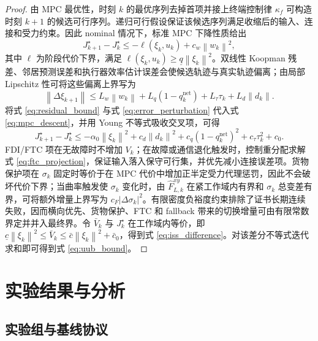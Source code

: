 \documentclass[twocolumn,3p,times,procedia]{elsarticle}
\newcommand{\norm}[1]{\left\lVert #1 \right\rVert}
\begin{document}
\begin{proof}
由 MPC 最优性，时刻 $k$ 的最优序列去掉首项并接上终端控制律 $\kappa_f$ 可构造时刻 $k+1$ 的候选可行序列。递归可行假设保证该候选序列满足收缩后的输入、连接和受力约束。因此 nominal 情况下，标准 MPC 下降性质给出
\begin{equation}
J_{k+1}^\star-J_k^\star\le -\ell(\xi_k,u_k)+c_w\norm{w_k}^2 ,
\label{eq:mpc_descent}
\end{equation}
其中 $\ell$ 为阶段代价下界，满足 $\ell(\xi_k,u_k)\ge \underline q\norm{\xi_k}^2$。双线性 Koopman 残差、邻居预测误差和执行器效率估计误差会使候选轨迹与真实轨迹偏离；由局部 Lipschitz 性可将这些偏离上界写为
\begin{equation}
\norm{\Delta \xi_{k+1}}\le L_w\norm{w_k}+L_q(1-q_k^{\mathrm{net}})+L_\tau\tau_k+L_d\norm{d_k}.
\label{eq:error_perturbation}
\end{equation}
将式 \eqref{eq:residual_bound} 与式 \eqref{eq:error_perturbation} 代入式 \eqref{eq:mpc_descent}，并用 Young 不等式吸收交叉项，可得
\begin{equation}
J_{k+1}^\star-J_k^\star\le -\alpha_0\norm{\xi_k}^2+c_d\norm{d_k}^2+c_q(1-q_k^{\mathrm{net}})^2+c_\tau\tau_k^2+c_0 .
\label{eq:descent_with_disturbance}
\end{equation}
FDI/FTC 项在无故障时不增加 $V_k$；在故障或通信退化触发时，控制重分配求解式 \eqref{eq:ftc_projection}，保证输入落入保守可行集，并优先减小连接误差项。货物保护项在 $\sigma_k$ 固定时等价于在 MPC 代价中增加正半定受力代理惩罚，因此不会破坏代价下界；当曲率触发使 $\sigma_k$ 变化时，由 $\hat F_{L,k}^{xy}$ 在紧工作域内有界和 $\sigma_k$ 总变差有界，可将额外增量上界写为 $c_F|\Delta\sigma_k|^2$。有限密度负裕度约束排除了证书长期连续失败，因而横向优先、货物保护、FTC 和 fallback 带来的切换增量可由有限常数界定并并入最终界。令 $\bar V_k$ 与 $J_k^\star$ 在工作域内等价，即 $\underline c\norm{\xi_k}^2\le \bar V_k\le \bar c\norm{\xi_k}^2+\bar c_0$，得到式 \eqref{eq:iss_difference}。对该差分不等式迭代求和即可得到式 \eqref{eq:uub_bound}。
\end{proof}


\section{实验结果与分析}

\subsection{实验组与基线协议}
\end{document}
